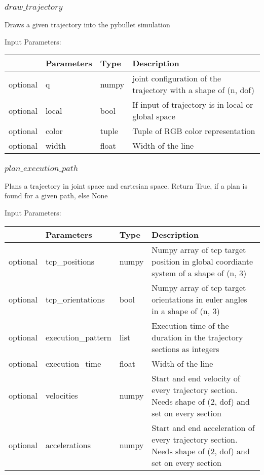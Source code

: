 \documentclass[
	ngerman,
	accentcolor=9c,%
	type=intern,
	marginpar=false
	]{tudapub}
\begin{document}
\subsubsection{$draw\_trajectory$}
\noindent Draws a given trajectory into the pybullet simulation

\vspace{0.5cm}
\noindent Input Parameters:
\vspace{0.5cm}

\begin{tabular}{|p{}|p{}|p{}| p{}|}
\hline
 & \textbf{Parameters} & \textbf{Type} & \textbf{Description} \\
\hline
optional & q & numpy & joint configuration of the trajectory with a shape of (n, dof)\\
\hline
optional & local & bool & If input of trajectory is in local or global space\\
\hline
optional & color & tuple & Tuple of RGB color representation\\
\hline
optional & width & float & Width of the line \\
\hline
\end{tabular}
\vspace{1cm}

\subsubsection{$plan\_execution\_path$}
\noindent Plans a trajectory in joint space and cartesian space. Return True, if a plan is found for a given path, else None

\vspace{0.5cm}
\noindent Input Parameters:
\vspace{0.5cm}

\begin{tabular}{|p{}|p{}|p{}| p{}|}
\hline
 & \textbf{Parameters} & \textbf{Type} & \textbf{Description} \\
\hline
optional & tcp\_positions & numpy &    Numpy array of tcp target position in global coordiante system of  a shape of (n, 3)\\
\hline
optional & tcp\_orientations & bool & Numpy array of tcp target orientations in euler angles in a shape of (n, 3)\\
\hline
optional & execution\_pattern & list & Execution time of the duration in the trajectory sections as integers\\
\hline
optional & execution\_time & float & Width of the line \\
\hline
optional & velocities & numpy & Start and end velocity of every trajectory section. Needs shape of (2, dof) and set on every section \\
\hline
optional & accelerations & numpy & Start and end acceleration of every trajectory section. Needs shape of (2, dof) and set  on every section \\
\hline
\end{tabular}
\vspace{1cm}
\end{document}
